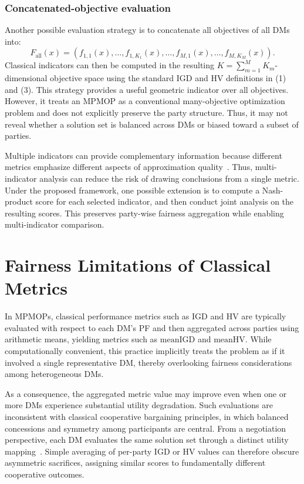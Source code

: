 \documentclass[journal]{IEEEtran}
\begin{document}
\subsubsection{Concatenated-objective evaluation}
Another possible evaluation strategy is to concatenate all objectives of all DMs into:
\[
F_{\mathrm{all}}(x)=
(f_{1,1}(x),\ldots,f_{1,K_1}(x),\ldots,
f_{M,1}(x),\ldots,f_{M,K_M}(x)).
\]
Classical indicators can then be computed in the resulting \(K=\sum_{m=1}^{M}K_m\)-dimensional objective space using the standard IGD and HV definitions in (1) and (3). This strategy provides a useful geometric indicator over all objectives. However, it treats an MPMOP as a conventional many-objective optimization problem and does not explicitly preserve the party structure. Thus, it may not reveal whether a solution set is balanced across DMs or biased toward a subset of parties.

Multiple indicators can provide complementary information because different metrics emphasize different aspects of approximation quality~\cite{wang2021statistical}. Thus, multi-indicator analysis can reduce the risk of drawing conclusions from a single metric. Under the proposed framework, one possible extension is to compute a Nash-product score for each selected indicator, and then conduct joint analysis on the resulting scores. This preserves party-wise fairness aggregation while enabling multi-indicator comparison.

\section{Fairness Limitations of Classical Metrics}
\label{sec:limitations}
In MPMOPs, classical performance metrics such as IGD and HV are typically evaluated with respect to each DM’s PF and then aggregated across parties using arithmetic means, yielding metrics such as $\mathrm{meanIGD}$ and $\mathrm{meanHV}$. While computationally convenient, this practice implicitly treats the problem as if it involved a single representative DM, thereby overlooking fairness considerations among heterogeneous DMs.

As a consequence, the aggregated metric value may improve even when one or more DMs experience substantial utility degradation. Such evaluations are inconsistent with classical cooperative bargaining principles, in which balanced concessions and symmetry among participants are central. From a negotiation perspective, each DM evaluates the same solution set through a distinct utility mapping~\cite{liu2020evolutionary,taherdoost2023multi,zhang2021personalized}. Simple averaging of per-party IGD or HV values can therefore obscure asymmetric sacrifices, assigning similar scores to fundamentally different cooperative outcomes.
\end{document}

